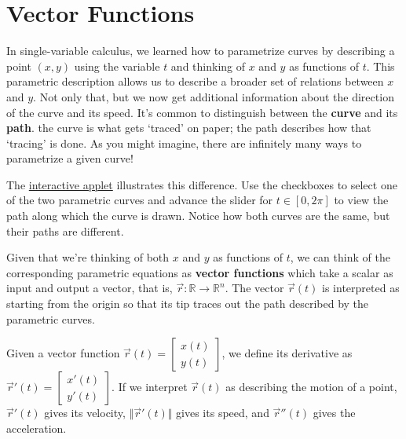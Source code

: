 \documentclass[
]{book}
\theoremstyle{definition}
\theoremstyle{definition}
\theoremstyle{definition}
\theoremstyle{definition}
\theoremstyle{remark}
\begin{document}
\hypertarget{vector-functions}{%
\section{Vector Functions}\label{vector-functions}}

In single-variable calculus, we learned how to parametrize curves by describing a point \((x,y)\) using the variable \(t\) and thinking of \(x\) and \(y\) as functions of \(t\). This parametric description allows us to describe a broader set of relations between \(x\) and \(y\). Not only that, but we now get additional information about the direction of the curve and its speed. It's common to distinguish between the \textbf{curve} and its \textbf{path}. the curve is what gets `traced' on paper; the path describes how that `tracing' is done. As you might imagine, there are infinitely many ways to parametrize a given curve!

The \href{https://www.geogebra.org/m/kffabg55}{interactive applet} illustrates this difference. Use the checkboxes to select one of the two parametric curves and advance the slider for \(t\in [0, 2\pi]\) to view the path along which the curve is drawn. Notice how both curves are the same, but their paths are different.

Given that we're thinking of both \(x\) and \(y\) as functions of \(t\), we can think of the corresponding parametric equations as \textbf{vector functions} which take a scalar as input and output a vector, that is, \(\vec{r}: \mathbb{R}\to\mathbb{R}^n\). The vector \(\vec{r}(t)\) is interpreted as starting from the origin so that its tip traces out the path described by the parametric curves.

Given a vector function \(\vec{r}(t)=\begin{bmatrix}x(t)\\y(t)\end{bmatrix}\), we define its derivative as \(\vec{r}'(t)=\begin{bmatrix}x'(t)\\y'(t)\end{bmatrix}\). If we interpret \(\vec{r}(t)\) as describing the motion of a point, \(\vec{r}'(t)\) gives its velocity, \(\Vert \vec{r}'(t)\Vert\) gives its speed, and \(\vec{r}''(t)\) gives the acceleration.
\end{document}
